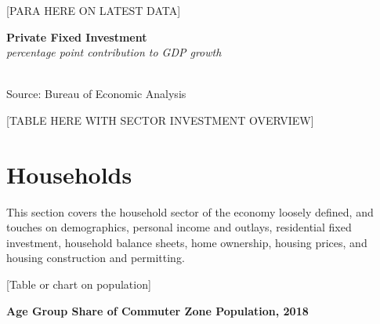 \documentclass{report}
\makeatletter
\newcommand{\tbllink}[1]{\href{https://raw.githubusercontent.com/bdecon/US-chartbook/master/chartbook/data/#1}{\faTable}}
\newcommand*\short[1]{\expandafter\@gobbletwo\number\numexpr#1\relax}
\newcommand{\sbar}[4]{
		\addplot[ybar stacked, bar width=2.7pt, draw opacity=0, fill=#1] 
			table [x=#2, y=#3, col sep=comma]{#4};}
\newcommand{\dateaxisticks}{
		date coordinates in=x, axis line style={draw=none},
		xmax={2020-02-01},
		max space between ticks=40,	    
		xtick={{1990-01-01}, {1992-01-01}, {1994-01-01}, 
			{1996-01-01}, {1998-01-01}, {2000-01-01}, 
			{2002-01-01}, {2004-01-01}, {2006-01-01},
			{2008-01-01}, {2010-01-01}, {2012-01-01}, {2014-01-01},
		    {2016-01-01}, {2018-01-01}, {2020-01-01}},
		minor xtick={{1989-01-01}, {1991-01-01}, {1993-01-01},
			{1995-01-01}, {1997-01-01}, {1999-01-01}, 
			{2001-01-01}, {2003-01-01}, {2005-01-01}, {2007-01-01},
		    {2009-01-01}, {2011-01-01}, {2013-01-01}, {2015-01-01},
		    {2017-01-01}, {2019-01-01}},
		enlarge y limits={0.06}, enlarge x limits={0.01},
		}
\newcommand{\bbar}[2]{extra #1 ticks = {{#2}}, extra #1 tick labels = ,
		extra #1 tick style = {grid=major, grid style={thick, black!25}},}
\newcommand{\rbars}{
		\fill[color=black!10] (axis cs:{1990-07-01},\pgfkeysvalueof{/pgfplots/ymin}) rectangle 
			(axis cs:{1991-03-01}, \pgfkeysvalueof{/pgfplots/ymax});
		\fill[color=black!10] (axis cs:{2007-12-01},\pgfkeysvalueof{/pgfplots/ymin}) rectangle 
			(axis cs:{2009-07-01}, \pgfkeysvalueof{/pgfplots/ymax});
		\fill[color=black!10] (axis cs:{2001-03-01},\pgfkeysvalueof{/pgfplots/ymin}) rectangle 
			(axis cs:{2001-11-01}, \pgfkeysvalueof{/pgfplots/ymax});}
\makeatother
\begin{document}
{{\begin{minipage}{0.76\textwidth}
[PARA HERE ON LATEST DATA]\\

\vspace{4mm} 

\noindent \normalsize \textbf{Private Fixed Investment}\\
\footnotesize{\textit{percentage point contribution to GDP growth}}\\
\noindent \hspace*{-3mm} \\
\footnotesize{Source: Bureau of Economic Analysis} \hfill \tbllink{inv.csv} \\

\vspace{3mm}

[TABLE HERE WITH SECTOR INVESTMENT OVERVIEW]

\end{minipage}

\newpage
\section*{\color{darkgray}\LARGE \seriffont Households}
\label{sec:hh}

\begin{minipage}{0.76\textwidth}
\small This section covers the household sector of the economy loosely defined, and touches on demographics, personal income and outlays, residential fixed investment, household balance sheets, home ownership, housing prices, and housing construction and permitting.

\vspace{2mm}

[Table or chart on population] \\

\end{minipage}

\vspace{8mm}

\noindent \normalsize \textbf{Age Group Share of Commuter Zone Population, 2018}

}}
\end{document}
